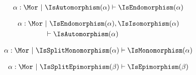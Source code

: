\begin{sequent}
\begin{align*}
  \alpha:\Mor ~|~ \IsAutomorphism( \alpha ) \vdash \IsEndomorphism( \alpha )
\end{align*}
\end{sequent}

\begin{sequent}
\begin{align*}
  \alpha:\Mor ~&|~  \IsEndomorphism( \alpha ), \IsIsomorphism( \alpha ) \\ 
  &\vdash \IsAutomorphism( \alpha )
\end{align*}
\end{sequent}

\begin{sequent}
\begin{align*}
  \alpha:\Mor ~|~ \IsSplitMonomorphism( \alpha ) \vdash \IsMonomorphism( \alpha )
\end{align*}
\end{sequent}

\begin{sequent}
\begin{align*}
  \alpha:\Mor ~|~ \IsSplitEpimorphism( \beta ) \vdash \IsEpimorphism( \beta )
\end{align*}
\end{sequent}
